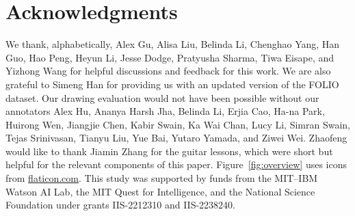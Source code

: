 \documentclass[11pt,a4paper]{article}
\begin{document}
\section*{Acknowledgments}
We thank, alphabetically, Alex Gu, Alisa Liu, Belinda Li, Chenghao Yang, Han Guo, Hao Peng, Heyun Li, Jesse Dodge, Pratyusha Sharma, Tiwa Eisape, and Yizhong Wang for helpful discussions and feedback for this work. We are also grateful to  Simeng Han for providing us with an updated version of the FOLIO dataset.
Our drawing evaluation would not have been possible without our annotators Alex Hu, Ananya Harsh Jha, Belinda Li, Erjia Cao, Ha-na Park, Huirong Wen, Jiangjie Chen, Kabir Swain, Ka Wai Chan, Lucy Li, Simran Swain, Tejas Srinivasan, Tianyu Liu, Yue Bai, Yutaro Yamada, and Ziwei Wei. 
Zhaofeng would like to thank Jiamin Zhang for the guitar lessons, which were short but helpful for the relevant components of this paper.
Figure~\ref{fig:overview} uses icons from \url{flaticon.com}. This study was supported by funds from the MIT--IBM Watson AI Lab, the MIT Quest for Intelligence, and the National Science Foundation under grants IIS-2212310 and IIS-2238240.
\fi




\clearpage
\appendix


\end{document}
